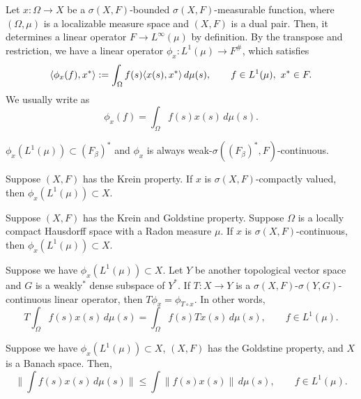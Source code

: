 \documentclass{../../../small}
\begin{document}
\begin{prop}
Let $x:\Omega\to X$ be a $\sigma(X,F)$-bounded $\sigma(X,F)$-measurable function, where $(\Omega,\mu)$ is a localizable measure space and $(X,F)$ is a dual pair.
Then, it determines a linear operator $F\to L^\infty(\mu)$ by definition.
By the transpose and restriction, we have a linear operator $\phi_x:L^1(\mu)\to F^\#$, which satisfies
\[\langle\phi_x(f),x^*\rangle:=\int_\Omega f(s)\langle x(s),x^*\rangle\,d\mu(s),\qquad f\in L^1(\mu),\ x^*\in F.\]
We usually write as
\[\phi_x(f)=\int_\Omega f(s)x(s)\,d\mu(s).\]
\begin{parts}
\item $\phi_x(L^1(\mu))\subset(F_\beta)^*$ and $\phi_x$ is always weak-$\sigma((F_\beta)^*,F)$-continuous.
\item Suppose $(X,F)$ has the Krein property.
If $x$ is $\sigma(X,F)$-compactly valued, then $\phi_x(L^1(\mu))\subset X$.
\item Suppose $(X,F)$ has the Krein and Goldstine property.
Suppose $\Omega$ is a locally compact Hausdorff space with a Radon measure $\mu$.
If $x$ is $\sigma(X,F)$-continuous, then $\phi_x(L^1(\mu))\subset X$.
\item Suppose we have $\phi_x(L^1(\mu))\subset X$. Let $Y$ be another topological vector space and $G$ is a weakly$^*$ dense subspace of $Y^*$. If $T:X\to Y$ is a $\sigma(X,F)$-$\sigma(Y,G)$-continuous linear operator, then $T\phi_x=\phi_{T\circ x}$. In other words,
\[T\int_\Omega f(s)x(s)\,d\mu(s)=\int_\Omega f(s)Tx(s)\,d\mu(s),\qquad f\in L^1(\mu).\]
\item Suppose we have $\phi_x(L^1(\mu))\subset X$, $(X,F)$ has the Goldstine property, and $X$ is a Banach space. Then,
\[\|\int f(s)x(s)\,d\mu(s)\|\le\int\|f(s)x(s)\|\,d\mu(s),\qquad f\in L^1(\mu).\]
\end{parts}
\end{prop}
\end{document}
